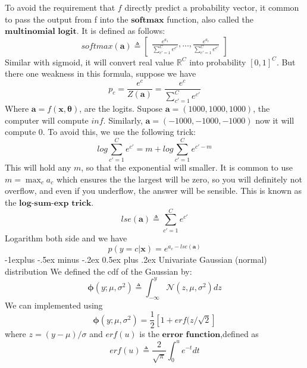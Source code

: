 \documentclass[10pt,landscape]{article}
\makeatletter
\newcommand{\inp}{\textbf{x}}
\newcommand{\parameter}{\boldsymbol{\theta}}
\newcommand{\R}{\mathbb{R}}
\newcommand{\variance}{\sigma^2}
\newcommand{\normal}{\mathcal{N}}
\renewcommand{\subsection}{\@startsection{subsection}{2}{0mm}%
                                {-1explus -.5ex minus -.2ex}%
                                {0.5ex plus .2ex}%
                                {\normalfont\normalsize\bfseries}}
\makeatother
\begin{document}
\begin{multicols*}{3}
To avoid the requirement that $f$ directly predict a probability vector, it common to pass the output from f into the $\textbf{softmax}$ function, also called the $\textbf{multinomial logit}$. It is defined as follows:
\[
    softmax(\mathbf{a})\triangleq
    \begin{bmatrix}
        \frac{e^{a_1}}{\sum_{c'=1}^{C}e^{c'}},...,
        \frac{e^{a_c}}{\sum_{c'=1}^{C}e^{c'}}
    \end{bmatrix}
\]
Similar with sigmoid, it will convert real value $\R^C$ into probability $[0,1]^C$.
But there one weakness in this formula, suppose we have
\[
    p_c=\frac{e^c}{Z(\mathbf{a})}=\frac{e^c}{\sum_{c'=1}^{C}e^{c'}}
\]
Where $\mathbf{a}=f(\inp,\parameter)$, are the logits.
Supose $\mathbf{a}=(1000,1000,1000)$, the computer will compute $inf$. Similarly, $\mathbf{a}=(-1000,-1000,-1000)$ now it will compute $0$. To avoid this, we use the following trick:
\[
    log\sum_{c'=1}^{C}e^{c'} = m +log\sum_{c'=1}^{C}e^{c'-m}
\]
This will hold any $m$, so that the exponential will smaller. It is common to use $m=\max_ca_c$ which ensures the the largest will be zero, so you will definitely not overflow, and even if you underflow, the answer will be sensible. This is known as the $\textbf{log-sum-exp trick}$.
\[
    lse(\mathbf{a})\triangleq \sum_{c'=1}^{C}e^{c'}
\]
Logarithm both side and we have
\[
    p(y=c|\inp)=e^{a_c-lse(\mathbf a)}
\]
\subsection{Univariate Gaussian (normal) distribution}
We defined the cdf of the Gaussian by:
\[
    \boldsymbol{\phi}(y;\mu,\variance)\triangleq\int_{-\infty}^{y}\normal(z,\mu,\variance)dz
\]
We can implemented using 
\[
    \boldsymbol{\phi}(y;\mu,\variance)=\frac{1}{2}[1+erf(z/\sqrt{2}]
\]
where $z=(y-\mu)/\sigma$ and $erf(u)$ is the $\textbf{error function}$,defined as
\[
    erf(u)\triangleq\frac{2}{\sqrt{\pi}}\int_{0}^{u}e^{-t}dt
\]


\end{multicols*}
\end{document}

